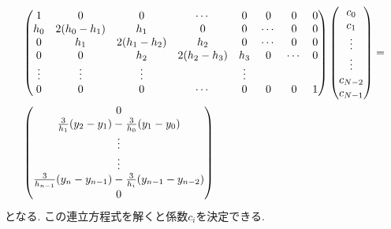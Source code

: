 \begin{align}
    &
    \begin{pmatrix}
        1 & 0 &  0 & \cdots & 0 & 0 & 0 & 0\\
        h_{0} & 2(h_{0} - h_{1}) & h_{1} & 0 & 0& \cdots & 0 & 0\\
        0 & h_{1} & 2(h_{1} - h_{2}) & h_{2} & 0 & \cdots &  0 & 0\\
        0 & 0 & h_{2} & 2(h_{2} - h_{3}) & h_{3} & 0 & \cdots & 0 \\
        \vdots & \vdots & \vdots & &  \vdots \\
        0 & 0 &  0 & \cdots & 0 & 0 & 0 & 1
    \end{pmatrix}
    \begin{pmatrix}
        c_{0} \\ c_{1} \\ \vdots \\ \vdots \\ c_{N-2} \\ c_{N-1}
    \end{pmatrix}
    =
    \notag \\
    &
    \begin{pmatrix}
        0 \\
        \frac{3}{h_{1}}(y_{2} - y_{1}) - \frac{3}{h_{0}}(y_{1} - y_{0}) \\
        \vdots \\
        \vdots \\
        \frac{3}{h_{n-1}}(y_{n} - y_{n-1}) - \frac{3}{h_{i}}(y_{n-1} - y_{n-2}) \\
        0
    \end{pmatrix}
    \notag
\end{align}
となる. この連立方程式を解くと係数$c_{i}$を決定できる.

\clearpage
%
%

